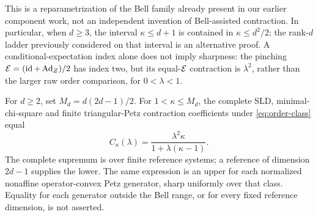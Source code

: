 This is a reparametrization of the Bell family already present in our earlier component work, not an independent invention of Bell-assisted contraction. In particular, when \(d\ge3\), the interval \(\kappa\le d+1\) is contained in \(\kappa\le d^2/2\); the rank-\(d\) ladder previously considered on that interval is an alternative proof. A conditional-expectation index alone does not imply sharpness: the pinching \(\mathcal E=(\operatorname{id}+\operatorname{Ad}_Z)/2\) has index two, but its equal-\(\mathcal E\) contraction is \(\lambda^2\), rather than the larger raw order comparison, for \(0<\lambda<1\).

\begin{theorem}\label{thm:order}
For \(d\ge2\), set \(M_d=d(2d-1)/2\). For \(1<\kappa\le M_d\), the complete SLD, minimal-chi-square and finite triangular-Petz contraction coefficients under \eqref{eq:order-class} equal
\begin{equation}\label{eq:profile}
 C_\kappa(\lambda)=\frac{\lambda^2\kappa}{1+\lambda(\kappa-1)}.
\end{equation}
The complete supremum is over finite reference systems; a reference of dimension \(2d-1\) supplies the lower. The same expression is an upper for each normalized nonaffine operator-convex Petz generator, sharp uniformly over that class. Equality for each generator outside the Bell range, or for every fixed reference dimension, is not asserted.
\end{theorem}
